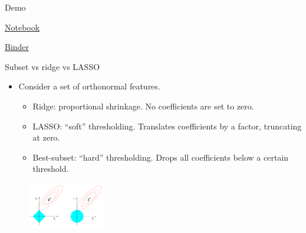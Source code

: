 \documentclass{beamer}
\begin{document}
\begin{frame}{Demo}
    \centerline{\href{https://github.com/materialsvirtuallab/nano281/tree/master/lectures}{Notebook}}
    \centerline{\href{https://mybinder.org/v2/gh/materialsvirtuallab/nano281/master?filepath=lectures}{Binder}}
\end{frame} 


\begin{frame}{Subset vs ridge vs LASSO}
    \begin{itemize}
        \item Consider a set of orthonormal features.
        \begin{itemize}
            \item Ridge: proportional shrinkage. No coefficients are set to zero.
            \item LASSO: ``soft'' thresholding. Translates coefficients by a factor, truncating at zero.
            \item Best-subset: ``hard'' thresholding. Drops all coefficients below a certain threshold.
        \end{itemize}
    \end{itemize}
    \begin{figure}
        \includegraphics[width=0.3\textwidth]{figures/fig3-14.pdf}
    \end{figure}
\end{frame} 
\end{document}
